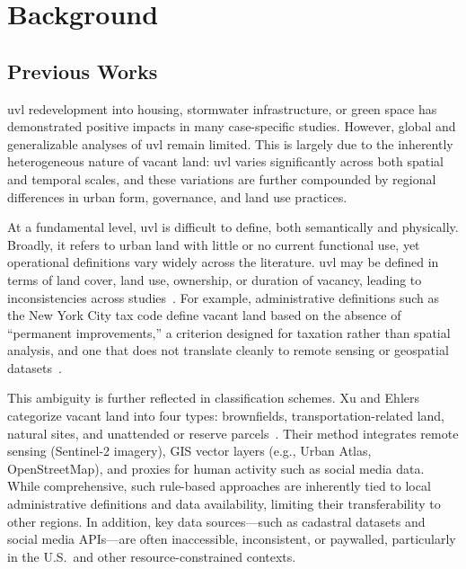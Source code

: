 \chapter{Background}
\label{ch:background}

\section{Previous Works}
\label{sec:previous_works}

\Acrshort{uvl} redevelopment into housing, stormwater infrastructure, or green space has demonstrated positive impacts in many case-specific studies. However, global and generalizable analyses of \acrshort{uvl} remain limited. This is largely due to the inherently heterogeneous nature of vacant land: \acrshort{uvl} varies significantly across both spatial and temporal scales, and these variations are further compounded by regional differences in urban form, governance, and land use practices.

At a fundamental level, \acrshort{uvl} is difficult to define, both semantically and physically. Broadly, it refers to urban land with little or no current functional use, yet operational definitions vary widely across the literature. \acrshort{uvl} may be defined in terms of land cover, land use, ownership, or duration of vacancy, leading to inconsistencies across studies~\cite{song2020Urban}. For example, administrative definitions such as the New York City tax code define vacant land based on the absence of ``permanent improvements,'' a criterion designed for taxation rather than spatial analysis, and one that does not translate cleanly to remote sensing or geospatial datasets~\cite{nycadmincode}.

This ambiguity is further reflected in classification schemes. Xu and Ehlers categorize vacant land into four types: brownfields, transportation-related land, natural sites, and unattended or reserve parcels~\cite{xu2022Automatica}. Their method integrates remote sensing (Sentinel-2 imagery), GIS vector layers (e.g., Urban Atlas, OpenStreetMap), and proxies for human activity such as social media data. While comprehensive, such rule-based approaches are inherently tied to local administrative definitions and data availability, limiting their transferability to other regions. In addition, key data sources---such as cadastral datasets and social media APIs---are often inaccessible, inconsistent, or paywalled, particularly in the U.S.\ and other resource-constrained contexts.


